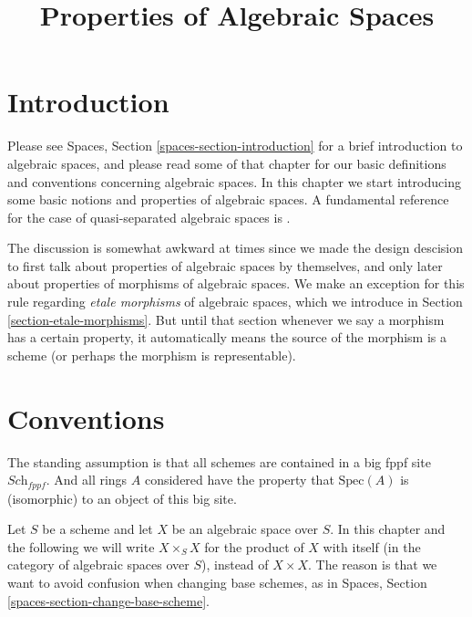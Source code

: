 

%


\title{Properties of Algebraic Spaces}


\maketitle

\label{section-phantom}

\tableofcontents

\section{Introduction}
\label{section-introduction}

\noindent
Please see Spaces, Section \ref{spaces-section-introduction}
for a brief introduction to algebraic spaces, and please read
some of that chapter for our basic definitions and conventions
concerning algebraic spaces. In this chapter we start introducing
some basic notions and properties of algebraic spaces. A fundamental
reference for the case of quasi-separated algebraic spaces is
\cite{Kn}.

\medskip\noindent
The discussion is somewhat awkward at times since we made the design
descision to first talk about properties of algebraic spaces by
themselves, and only later about properties of morphisms of algebraic
spaces. We make an exception for this rule regarding
{\it etale morphisms} of algebraic spaces, which we introduce in
Section \ref{section-etale-morphisms}. But until that section whenever
we say a morphism has a certain property, it automatically means the
source of the morphism is a scheme (or perhaps the morphism is representable).



\section{Conventions}
\label{section-conventions}

\noindent
The standing assumption is that all schemes are contained in
a big fppf site $\textit{Sch}_{fppf}$. And all rings $A$ considered
have the property that $\text{Spec}(A)$ is (isomorphic) to an
object of this big site.

\medskip\noindent
Let $S$ be a scheme and let $X$ be an algebraic space over $S$.
In this chapter and the following we will write $X \times_S X$
for the product of $X$ with itself (in the category of algebraic
spaces over $S$), instead of $X \times X$. The reason is that we
want to avoid confusion when changing base schemes, as in
Spaces, Section \ref{spaces-section-change-base-scheme}.


